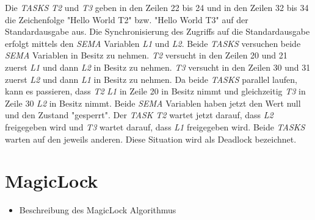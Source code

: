 Die \textit{TASKS} \textit{T2} und \textit{T3} geben in den Zeilen 22 bis 24 und in den Zeilen 32 bis 34 die Zeichenfolge "Hello World T2" bzw. "Hello World T3" auf der Standardausgabe aus. Die Synchronisierung des Zugriffs auf die Standardausgabe erfolgt mittels den \textit{SEMA} Variablen \textit{L1} und \textit{L2}. Beide \textit{TASKS} versuchen beide \textit{SEMA} Variablen in Besitz zu nehmen. \textit{T2} versucht in den Zeilen 20 und 21 zuerst \textit{L1} und dann \textit{L2} in Besitz zu nehmen. \textit{T3} versucht in den Zeilen 30 und 31 zuerst \textit{L2} und dann \textit{L1} in Besitz zu nehmen. Da beide \textit{TASKS} parallel laufen, kann es passieren, dass \textit{T2} \textit{L1} in Zeile 20 in Besitz nimmt und gleichzeitig \textit{T3} in Zeile 30 \textit{L2} in Besitz nimmt. Beide \textit{SEMA} Variablen haben jetzt den Wert null und den Zustand "gesperrt". Der \textit{TASK} \textit{T2} wartet jetzt darauf, dass \textit{L2} freigegeben wird und \textit{T3} wartet darauf, dass \textit{L1} freigegeben wird. Beide \textit{TASKS} warten auf den jeweils anderen. Diese Situation wird als Deadlock bezeichnet.

\section{MagicLock}
\label{section:MagicLock}
\begin{itemize}
  \item Beschreibung des MagicLock \autocite{MagicLock} Algorithmus
\end{itemize}